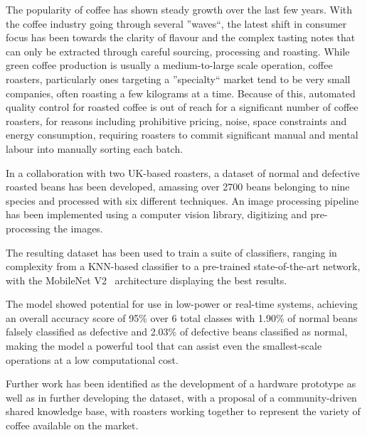 The popularity of coffee has shown steady growth over the last few years.
With the coffee industry going through several ''waves``, the latest shift in consumer focus has been towards
the clarity of flavour and the complex tasting notes that can only be extracted through careful sourcing, processing and roasting.
While green coffee production is usually a medium-to-large scale operation, coffee roasters, particularly ones targeting a
''specialty`` market tend to be very small companies, often roasting a few kilograms at a time.
Because of this, automated quality control for roasted coffee is out of reach for a significant number of coffee roasters,
for reasons including prohibitive pricing, noise, space constraints and energy consumption, requiring roasters to commit
significant manual and mental labour into manually sorting each batch.

In a collaboration with two UK-based roasters, a dataset of normal and defective roasted beans has been developed, amassing
over 2700 beans belonging to nine species and processed with six different techniques.
An image processing pipeline has been implemented using a computer vision library, digitizing and pre-processing the images.

The resulting dataset has been used to train a suite of classifiers, ranging in complexity from a KNN-based classifier to
a pre-trained state-of-the-art network, with the MobileNet V2~\cite{mobileNet} architecture displaying the best results.

The model showed potential for use in low-power or real-time systems, achieving an overall accuracy score of 95\% over 6 total classes with
1.90\% of normal beans falsely classified as defective and 2.03\% of defective beans classified as normal, making the model
a powerful tool that can assist even the smallest-scale operations at a low computational cost.

Further work has been identified as the development of a hardware prototype as well as in further developing the dataset,
with a proposal of a community-driven shared knowledge base, with roasters working together to represent the variety of coffee
available on the market.
